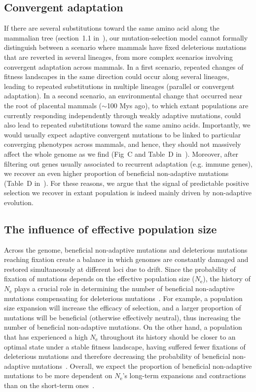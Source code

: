 \documentclass[10pt,letterpaper]{article}
\newcommand{\Ne}{N_{\text{e}}}
\begin{document}
\subsection*{Convergent adaptation}

If there are several substitutions toward the same amino acid along the mammalian tree (section~1.1 in~), our mutation-selection model cannot formally distinguish between a scenario where mammals have fixed deleterious mutations that are reverted in several lineages, from more complex scenarios involving convergent adaptation across mammals.
In a first scenario, repeated changes of fitness landscapes in the same direction could occur along several lineages, leading to repeated substitutions in multiple lineages (parallel or convergent adaptation).
In a second scenario, an environmental change that occurred near the root of placental mammals ($\sim$100 Mys ago), to which extant populations are currently responding independently through weakly adaptive mutations, could also lead to repeated substitutions toward the same amino acids.
Importantly, we would usually expect adaptive convergent mutations to be linked to particular converging phenotypes across mammals, and hence, they should not massively affect the whole genome as we find (Fig~C and Table~D in~).
Moreover, after filtering out genes usually associated to recurrent adaptation (e.g. immune genes), we recover an even higher proportion of beneficial non-adaptive mutations (Table~D in~).
For these reasons, we argue that the signal of predictable positive selection we recover in extant population is indeed mainly driven by non-adaptive evolution.

\subsection*{The influence of effective population size}

Across the genome, beneficial non-adaptive mutations and deleterious mutations reaching fixation create a balance in which genomes are constantly damaged and restored simultaneously at different loci due to drift.
Since the probability of fixation of mutations depends on the effective population size ($\Ne$), the history of $\Ne$ plays a crucial role in determining the number of beneficial non-adaptive mutations compensating for deleterious mutations~\cite{latrille_inferring_2021}.
For example, a population size expansion will increase the efficacy of selection, and a larger proportion of mutations will be beneficial (otherwise effectively neutral), thus increasing the number of beneficial non-adaptive mutations.
On the other hand, a population that has experienced a high $\Ne$ throughout its history should be closer to an optimal state under a stable fitness landscape, having suffered fewer fixations of deleterious mutations and therefore decreasing the probability of beneficial non-adaptive mutations~\cite{huber_determining_2017}.
Overall, we expect the proportion of beneficial non-adaptive mutations to be more dependent on $\Ne$’s long-term expansions and contractions than on the short-term ones~\cite{charlesworth_other_2007,huber_determining_2017}.
\end{document}
